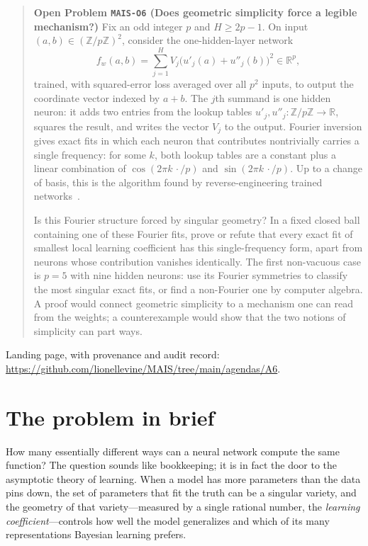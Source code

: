 \documentclass[11pt]{amsart}
\theoremstyle{plain}
\theoremstyle{definition}
\begin{document}
\begin{quote}
\textbf{Open Problem \texttt{MAIS-O6} (Does geometric simplicity force a legible mechanism?)}
Fix an odd integer $p$ and $H\geq 2p-1$. On input $(a,b)\in(\mathbb{Z}/p\mathbb{Z})^2$, consider the one-hidden-layer network
\[
   f_w(a,b)=\sum_{j=1}^H V_j\bigl(u'_j(a)+u''_j(b)\bigr)^2\in\mathbb{R}^p,
\]
trained, with squared-error loss averaged over all $p^2$ inputs, to output the coordinate vector indexed by $a+b$. The $j$th summand is one hidden neuron: it adds two entries from the lookup tables $u'_j,u''_j\colon\mathbb{Z}/p\mathbb{Z}\to\mathbb{R}$, squares the result, and writes the vector $V_j$ to the output. Fourier inversion gives exact fits in which each neuron that contributes nontrivially carries a single frequency: for some $k$, both lookup tables are a constant plus a linear combination of $\cos(2\pi k\,\cdot/p)$ and $\sin(2\pi k\,\cdot/p)$. Up to a change of basis, this is the algorithm found by reverse-engineering trained networks~\cite{nanda2023}.

Is this Fourier structure forced by singular geometry? In a fixed closed ball containing one of these Fourier fits, prove or refute that every exact fit of smallest local learning coefficient has this single-frequency form, apart from neurons whose contribution vanishes identically. The first non-vacuous case is $p=5$ with nine hidden neurons: use its Fourier symmetries to classify the most singular exact fits, or find a non-Fourier one by computer algebra. A proof would connect geometric simplicity to a mechanism one can read from the weights; a counterexample would show that the two notions of simplicity can part ways.
\end{quote}

\noindent Landing page, with provenance and audit record: \url{https://github.com/lionellevine/MAIS/tree/main/agendas/A6}.

\setcounter{tocdepth}{1}
\tableofcontents

\section{The problem in brief}\label{sec:brief}

How many essentially different ways can a neural network compute the same function? The question sounds like bookkeeping; it is in fact the door to the asymptotic theory of learning. When a model has more parameters than the data pins down, the set of parameters that fit the truth can be a singular variety, and the geometry of that variety---measured by a single rational number, the \emph{learning coefficient}---controls how well the model generalizes and which of its many representations Bayesian learning prefers.
\end{document}
